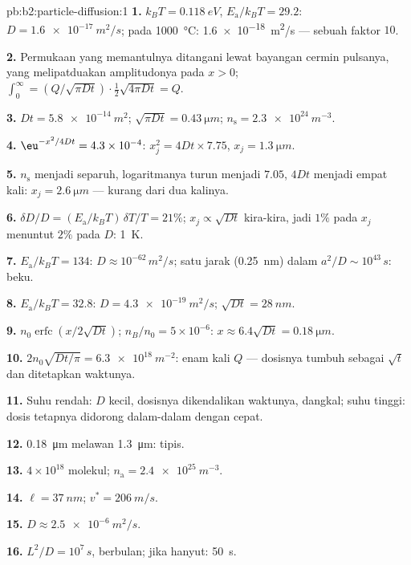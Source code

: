 \begin{solution}{pb:b2:particle-diffusion:1}
\textbf{1.} $k_BT = \qty{0.118}{eV}$, $E_{\text{a}}/k_BT = 29.2$: $D =
\qty{1.6e-17}{m^2/s}$; pada \qty{1000}{\celsius}: \qty{1.6e-18}{m^2/s} --- sebuah
faktor $10$.

\textbf{2.} Permukaan yang memantulnya ditangani lewat bayangan cermin
pulsanya, yang melipatduakan amplitudonya pada $x > 0$; $\int_0^\infty = (Q/\sqrt{\pi Dt})
\cdot \tfrac12\sqrt{4\pi Dt} = Q$.

\textbf{3.} $Dt = \qty{5.8e-14}{m^2}$; $\sqrt{\pi Dt} = \qty{0.43}{\micro m}$; $n_{\text{s}}
= \qty{2.3e24}{m^{-3}}$.

\textbf{4.} $\eu^{-x^2/4Dt} = 4.3 \times 10^{-4}$: $x_j^2 = 4Dt \times 7.75$, $x_j =
\qty{1.3}{\micro m}$.

\textbf{5.} $n_{\text{s}}$ menjadi separuh, logaritmanya turun menjadi $7.05$, $4Dt$
menjadi empat kali: $x_j = \qty{2.6}{\micro m}$ --- kurang dari dua kalinya.

\textbf{6.} $\delta D/D = (E_{\text{a}}/k_BT)\,\delta T/T = 21\%$; $x_j \propto
\sqrt{Dt}$ kira-kira, jadi $1\%$ pada $x_j$ menuntut $2\%$ pada $D$: \qty{1}{K}.

\textbf{7.} $E_{\text{a}}/k_BT = 134$: $D \approx 10^{-62}\,\unit{m^2/s}$; satu
jarak (\qty{0.25}{nm}) dalam $a^2/D \sim 10^{43}\,\unit{s}$: beku.

\textbf{8.} $E_{\text{a}}/k_BT = 32.8$: $D = \qty{4.3e-19}{m^2/s}$; $\sqrt{Dt} =
\qty{28}{nm}$.

\textbf{9.} $n_0\operatorname{erfc}(x/2\sqrt{Dt})$; $n_B/n_0 = 5 \times 10^{-6}$:
$x \approx 6.4\sqrt{Dt} = \qty{0.18}{\micro m}$.

\textbf{10.} $2n_0\sqrt{Dt/\pi} = \qty{6.3e18}{m^{-2}}$: enam kali $Q$ ---
dosisnya tumbuh sebagai $\sqrt t$ dan ditetapkan waktunya.

\textbf{11.} Suhu rendah: $D$ kecil, dosisnya dikendalikan waktunya,
dangkal; suhu tinggi: dosis tetapnya didorong dalam-dalam dengan cepat.

\textbf{12.} \qty{0.18}{\micro m} melawan \qty{1.3}{\micro m}: tipis.

\textbf{13.} $4 \times 10^{18}$ molekul; $n_{\text{a}} = \qty{2.4e25}{m^{-3}}$.

\textbf{14.} $\ell = \qty{37}{nm}$; $v^* = \qty{206}{m/s}$.

\textbf{15.} $D \approx \qty{2.5e-6}{m^2/s}$.

\textbf{16.} $L^2/D = 10^7\,\unit{s}$, berbulan; jika hanyut: \qty{50}{s}.


\end{solution}

